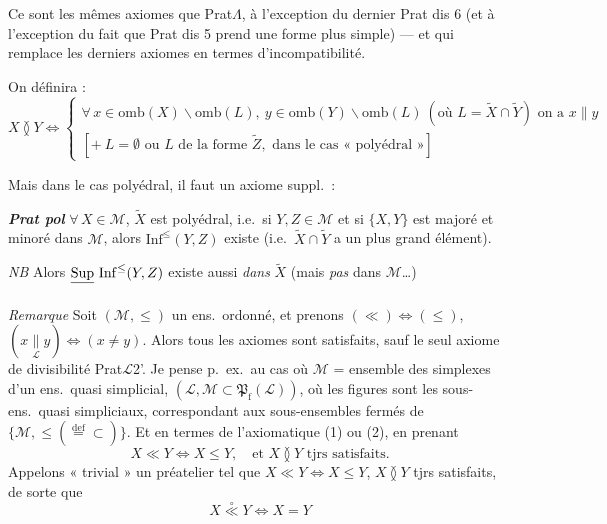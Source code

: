 \documentclass[11pt,a4paper]{article}
\begin{document}
Ce sont les mêmes axiomes que Prat$\Lambda$, à l'exception du dernier Prat dis 6 (et à l'exception du fait que Prat dis 5 prend une forme plus simple) — et qui remplace les derniers axiomes en termes d'incompatibilité.

On définira :
\[
  X \between Y \iff
  \begin{cases}
    \forall\, x \in \mathrm{omb}(X) \smallsetminus \mathrm{omb}(L),\ y \in \mathrm{omb}(Y) \smallsetminus \mathrm{omb}(L) \ (\text{où } L = \widetilde{X} \cap \widetilde{Y}) \text{ on a } x \parallel y \\
    [+\ L = \emptyset \text{ ou } L \text{ de la forme } \widetilde{Z}, \text{ dans le cas « polyédral »}]
  \end{cases}
\]

Mais dans le cas polyédral, il faut un axiome suppl.\ :

\textbf{\emph{Prat pol}} $\forall\, X \in \mathcal{M}$, $\widetilde{X}$ est polyédral, i.e.\ si $Y, Z \in \mathcal{M}$ et si $\lbrace X, Y \rbrace$ est majoré et minoré dans $\mathcal{M}$, alors $\mathrm{Inf}^{\leq}(Y, Z)$ existe (i.e.\ $\widetilde{X} \cap \widetilde{Y}$ a un plus grand élément).

\emph{NB} Alors $\struck{\mathrm{Sup}}\ \mathrm{Inf}^{\leq}(Y, Z)$ existe aussi \emph{dans} $\widetilde{X}$ (mais \emph{pas}  dans $\mathcal{M}$…)

\emph{Remarque} Soit $(\mathcal{M}, \leq)$ un ens.\ ordonné, et prenons $(\ll) \Leftrightarrow (\leq)$, $(x \underset{\mathcal{L}}{\parallel} y) \Leftrightarrow (x \neq y)$. Alors tous les axiomes sont satisfaits, sauf le seul axiome de divisibilité Prat$\mathcal{L}$2'. Je pense p.\ ex.\ au cas où $\mathcal{M}$ = ensemble des simplexes d'un ens.\ quasi simplicial, $(\mathcal{L}, \mathcal{M} \subset \mathfrak{P}_{\mathrm{f}}(\mathcal{L}))$, où les figures sont les sous-ens.\ quasi simpliciaux, correspondant aux sous-ensembles fermés de $\lbrace \mathcal{M}, \leq (\overset{\mathrm{def}}{=} \subset) \rbrace$. Et en termes de l'axiomatique (1) ou (2), en prenant
\[
  X \ll Y \iff X \leq Y , \quad \text{et } X \between Y \text{ tjrs satisfaits.}
\]
 Appelons « trivial » un préatelier tel que $X \ll Y \iff X \leq Y$, $X \between Y$ tjrs satisfaits, de sorte que
\[
  X \overset{\circ}{\ll} Y \iff X = Y
\]
\end{document}
